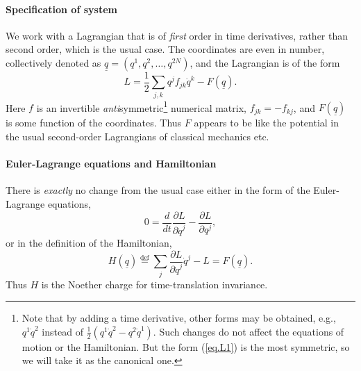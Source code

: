 \documentclass{article}
\providecommand{\eqdef}{\stackrel{\textrm{def}}{=}}
\begin{document}
\paragraph{Specification of system}
We work with a Lagrangian that is of \emph{first} order in time
derivatives, rather than second order, which is the usual case.  The
coordinates are even in number, collectively denoted as $\underline{q}
= (q^1, q^2, \dots, q^{2N})$, and the Lagrangian is of the form
\begin{equation}
\label{eq.L1}
  L = \frac{1}{2} \sum_{j,k} q^j f_{jk} \dot{q}^k - F(\underline{q}).
\end{equation}
Here $f$ is an invertible \emph{anti}symmetric\footnote{Note that by
  adding a time derivative, other forms may be obtained, e.g.,
  $q^1\dot{q}^2$ instead of $\frac{1}{2}(q^1\dot{q}^2-q^2\dot{q}^1)$.
  Such changes do not affect the equations of motion or the
  Hamiltonian.  But the form (\ref{eq.L1}) is the most symmetric, so
  we will take it as the canonical one.} numerical matrix,
$f_{jk}=-f_{kj}$, and $F(\underline{q})$ is some function of the
coordinates.  Thus $F$ appears to be like the potential in the usual
second-order Lagrangians of classical mechanics etc.

\paragraph{Euler-Lagrange equations and Hamiltonian}
There is \emph{exactly} no change from the usual case
either in the form of the Euler-Lagrange equations,
\begin{equation}
  \label{eq:E-L}
  0 = \frac{d}{dt} \frac{\partial L}{\partial \dot{q}^j} - \frac{\partial L}{\partial q^j},
\end{equation}
or in the definition of the Hamiltonian,
\begin{equation}
  \label{eq:H}
  H(\underline{q})
  \eqdef \sum_j \frac{\partial L}{\partial \dot{q}^j} \dot{q}^j - L
  = F(\underline{q}).
\end{equation}
Thus $H$ is the Noether charge for time-translation invariance.  
\end{document}
